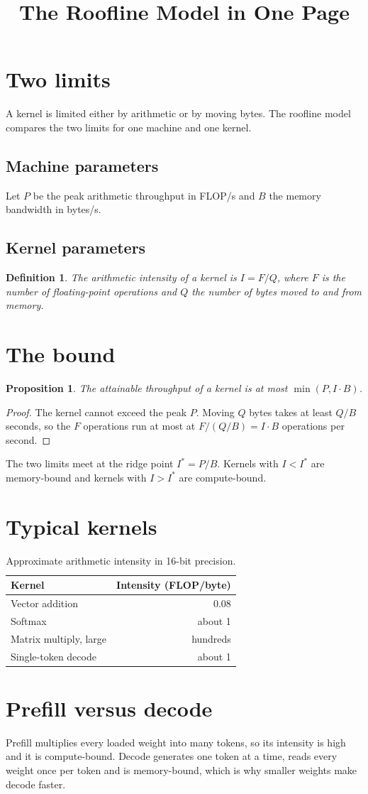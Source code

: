 \documentclass{article}
\title{The Roofline Model in One Page}
\newtheorem{definition}{Definition}
\newtheorem{proposition}{Proposition}
\begin{document}
\maketitle

\section{Two limits}
A kernel is limited either by arithmetic or by moving bytes.
The roofline model compares the two limits for one machine and one kernel.

\subsection{Machine parameters}
Let $P$ be the peak arithmetic throughput in FLOP/s and $B$ the memory bandwidth in bytes/s.

\subsection{Kernel parameters}
\begin{definition}
The \emph{arithmetic intensity} of a kernel is $I = F / Q$, where $F$ is the number of floating-point operations and $Q$ the number of bytes moved to and from memory.
\end{definition}

\section{The bound}
\begin{proposition}
The attainable throughput of a kernel is at most $\min(P, I \cdot B)$.
\end{proposition}
\begin{proof}
The kernel cannot exceed the peak $P$. Moving $Q$ bytes takes at least $Q / B$ seconds, so the $F$ operations run at most at $F / (Q/B) = I \cdot B$ operations per second.
\end{proof}

The two limits meet at the ridge point $I^\ast = P / B$. Kernels with $I < I^\ast$ are memory-bound and kernels with $I > I^\ast$ are compute-bound.

\section{Typical kernels}
\begin{table}[h]
\centering
\begin{tabular}{lr}
Kernel & Intensity (FLOP/byte) \\
\hline
Vector addition & 0.08 \\
Softmax & about 1 \\
Matrix multiply, large & hundreds \\
Single-token decode & about 1 \\
\end{tabular}
\caption{Approximate arithmetic intensity in 16-bit precision.}
\end{table}

\section{Prefill versus decode}
Prefill multiplies every loaded weight into many tokens, so its intensity is high and it is compute-bound.
Decode generates one token at a time, reads every weight once per token and is memory-bound, which is why smaller weights make decode faster.
\end{document}

